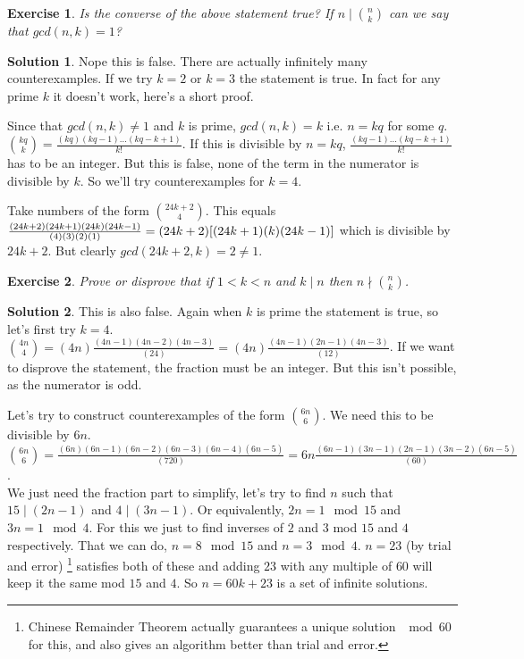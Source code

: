 \documentclass[a4paper,10pt]{article}
\newtheorem{exercise}{Exercise}[section]
\theoremstyle{definition} %
\newtheorem*{solution}{Solution}
\begin{document}
    \begin{exercise}
        Is the converse of the above statement true? If $n \mid \binom{n}{k}$ can we say that
        $gcd(n,k)=1$?
    \end{exercise}
    \begin{solution}
        Nope this is false. There are actually infinitely many counterexamples.
        If we try $k = 2$ or $k = 3$ the statement is true. In fact for any prime $k$
        it doesn't work, here's a short proof.

        Since that $gcd(n,k) \neq 1$ and $k$ is prime, $gcd(n,k)=k$ i.e. $n = kq$ for 
        some $q$. $\binom{kq}{k} = \frac{(kq)(kq-1)\dots(kq-k+1)}{k!}$. If this is divisible
        by $n=kq$, $\frac{(kq-1)\dots(kq-k+1)}{k!}$ has to be an integer. But this is false, 
        none of the term in the numerator is divisible by $k$. So we'll try counterexamples 
        for $k = 4$.

        Take numbers of the form $\binom{24k+2}{4}$. This equals $\frac{(24k+2)(24k+1)(24k)(24k-1)}{(4)(3)(2)(1)} \\
        = (24k+2)[(24k+1)(k)(24k-1)]$ which is divisible by $24k+2$. But clearly $gcd(24k+2,k) = 2 \neq 1$.
    \end{solution}

    \begin{exercise}
        Prove or disprove that if $1 < k < n$ and $k \mid n$ then $n \nmid \binom{n}{k}$.
    \end{exercise}
    \begin{solution}
        This is also false. Again when $k$ is prime the statement is true, so let's first try
        $k = 4$. \\  
        $\binom{4n}{4} = (4n)\frac{(4n-1)(4n-2)(4n-3)}{(24)} = (4n)\frac{(4n-1)(2n-1)(4n-3)}{(12)}$.
        If we want to disprove the statement, the fraction must be an integer. But this isn't possible,
        as the numerator is odd.

        Let's try to construct counterexamples of the form $\binom{6n}{6}$.
        We need this to be divisible by $6n$. \\
        $\binom{6n}{6} = \frac{(6n)(6n-1)(6n-2)(6n-3)(6n-4)(6n-5)}{(720)} = 
        6n\frac{(6n-1)(3n-1)(2n-1)(3n-2)(6n-5)}{(60)}$. \\
        We just need the fraction part to simplify, let's try to find $n$ such 
        that $15 \mid (2n-1)$ and $4 \mid (3n-1)$. 
        Or equivalently, $2n = 1 \mod 15$ and $3n = 1 \mod 4$.
        For this we just to find inverses
        of $2$ and $3$ mod $15$ and $4$ respectively. That we can do, $n = 8 \mod 15$
        and $n = 3 \mod 4$. $n = 23$ (by trial and error)
        \footnote{Chinese Remainder Theorem actually guarantees a unique solution
        $\mod 60$ for this, and also gives an algorithm better than trial and error.} 
        satisfies both of these and
        adding $23$ with any multiple of $60$ will keep it the same mod $15$ and $4$.
        So $n = 60k+23$ is a set of infinite solutions. 
    \end{solution}
\end{document}
